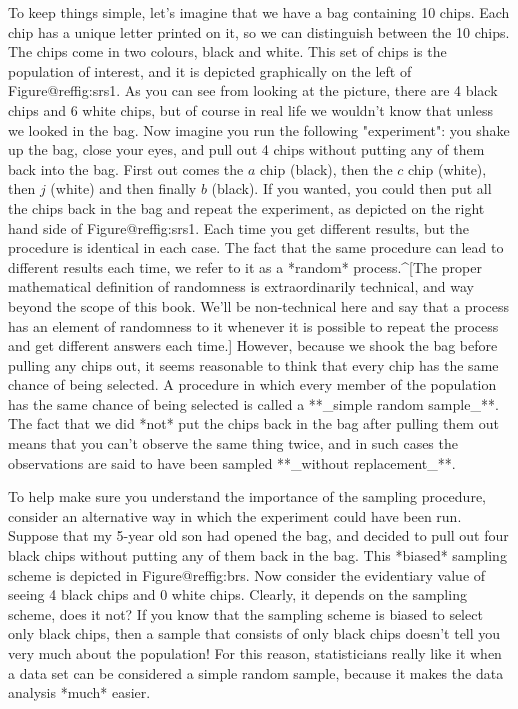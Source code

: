 To keep things simple, let's imagine that we have a bag containing 10 chips. Each chip has a unique letter printed on it, so we can distinguish between the 10 chips. The chips come in two colours, black and white. This set of chips is the population of interest, and it is depicted graphically on the left of Figure@reffig:srs1. As you can see from looking at the picture, there are 4 black chips and 6 white chips, but of course in real life we wouldn't know that unless we looked in the bag. Now imagine you run the following "experiment": you shake up the bag, close your eyes, and pull out 4 chips without putting any of them back into the bag. First out comes the $a$ chip (black), then the $c$ chip (white), then $j$ (white) and then finally $b$ (black). If you wanted, you could then put all the chips back in the bag and repeat the experiment, as depicted on the right hand side of Figure@reffig:srs1. Each time you get different results, but the procedure is identical in each case. The fact that the same procedure can lead to different results each time, we refer to it as a *random* process.^[The proper mathematical definition of randomness is extraordinarily technical, and way beyond the scope of this book. We'll be non-technical here and say that a process has an element of randomness to it whenever it is possible to repeat the process and get different answers each time.] However, because we shook the bag before pulling any chips out, it seems reasonable to think that every chip has the same chance of being selected. A procedure in which every member of the population has the same chance of being selected is called a **_simple random sample_**. The fact that we did *not* put the chips back in the bag after pulling them out means that you can't observe the same thing twice, and in such cases the observations are said to have been sampled **_without replacement_**. 

To help make sure you understand the importance of the sampling procedure, consider an alternative way in which the experiment could have been run. Suppose that my 5-year old son had opened the bag, and decided to pull out four black chips without putting any of them back in the bag. This *biased* sampling scheme is depicted in Figure@reffig:brs. Now consider the evidentiary value of seeing 4 black chips and 0 white chips. Clearly, it depends on the sampling scheme, does it not? If you know that the sampling scheme is biased to select only black chips, then a sample that consists of only black chips doesn't tell you very much about the population! For this reason, statisticians really like it when a data set can be considered a simple random sample, because it makes the data analysis *much* easier.  

